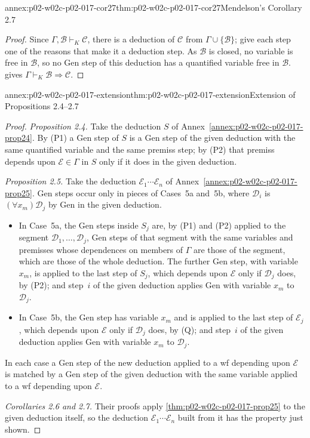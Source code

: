 \begin{annexitem}{annex:p02-w02c-p02-017-cor27}{thm:p02-w02c-p02-017-cor27}{Mendelson's Corollary 2.7}
\begin{proof}
Since \(\Gamma,\mathscr B\vdash_K\mathscr C\), there is a deduction of
\(\mathscr C\) from \(\Gamma\cup\{\mathscr B\}\); give each step one of the
reasons that make it a deduction step.  As \(\mathscr B\) is closed, no
variable is free in \(\mathscr B\), so no Gen step of this deduction has a
quantified variable free in \(\mathscr B\).
 gives
\(\Gamma\vdash_K\mathscr B\Rightarrow\mathscr C\).
\end{proof}
\end{annexitem}

\begin{annexitem}{annex:p02-w02c-p02-017-extension}{thm:p02-w02c-p02-017-extension}{Extension of Propositions 2.4--2.7}
\begin{proof}
\emph{Proposition 2.4.}  Take the deduction \(S\) of
Annex~\ref{annex:p02-w02c-p02-017-prop24}.  By (P1) a Gen step of \(S\) is a Gen
step of the given deduction with the same quantified variable and the same
premiss step; by (P2) that premiss depends upon \(\mathscr E\in\Gamma\) in
\(S\) only if it does in the given deduction.

\emph{Proposition 2.5.}  Take the deduction \(\mathcal E_1\cdots\mathcal E_n\)
of Annex~\ref{annex:p02-w02c-p02-017-prop25}.  Gen steps occur only in pieces of
Cases~5a and~5b, where \(\mathscr D_i\) is \((\forall x_m)\mathscr D_j\) by
Gen in the given deduction.
\begin{itemize}
  \item In Case~5a, the Gen steps inside \(S_j\) are, by (P1) and (P2) applied
        to the segment \(\mathscr D_1,\ldots,\mathscr D_j\), Gen steps of that
        segment with the same variables and premisses whose dependences on
        members of \(\Gamma\) are those of the segment, which are those of the
        whole deduction.  The further Gen step, with variable \(x_m\), is
        applied to the last step of \(S_j\), which depends upon
        \(\mathscr E\) only if \(\mathscr D_j\) does, by (P2); and step~\(i\)
        of the given deduction applies Gen with variable \(x_m\) to
        \(\mathscr D_j\).
  \item In Case~5b, the Gen step has variable \(x_m\) and is applied to the
        last step of \(\mathcal E_j\), which depends upon \(\mathscr E\) only
        if \(\mathscr D_j\) does, by (Q); and step~\(i\) of the given
        deduction applies Gen with variable \(x_m\) to \(\mathscr D_j\).
\end{itemize}
In each case a Gen step of the new deduction applied to a wf depending upon
\(\mathscr E\) is matched by a Gen step of the given deduction with the same
variable applied to a wf depending upon \(\mathscr E\).

\emph{Corollaries 2.6 and 2.7.}  Their proofs apply
\cref{thm:p02-w02c-p02-017-prop25} to the given deduction itself, so the
deduction \(\mathcal E_1\cdots\mathcal E_n\) built from it has the property
just shown.
\end{proof}
\end{annexitem}

